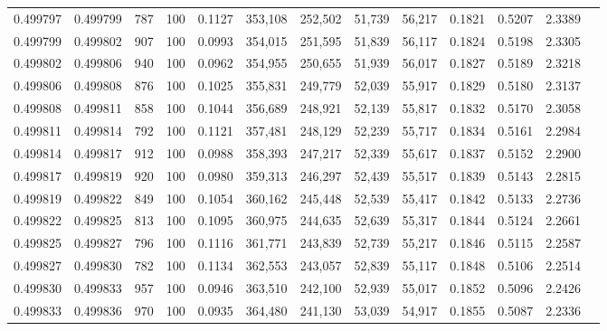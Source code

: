 \begin{tabular}{rrrrrrrrrrrrr}
0.499797 & 0.499799 &   787 & 100 &                                     0.1127 & 353,108 & 252,502 &  51,739 &  56,217 & 0.1821 & 0.5207 & 2.3389 \\
0.499799 & 0.499802 &   907 & 100 &                                     0.0993 & 354,015 & 251,595 &  51,839 &  56,117 & 0.1824 & 0.5198 & 2.3305 \\
0.499802 & 0.499806 &   940 & 100 &                                     0.0962 & 354,955 & 250,655 &  51,939 &  56,017 & 0.1827 & 0.5189 & 2.3218 \\
0.499806 & 0.499808 &   876 & 100 &                                     0.1025 & 355,831 & 249,779 &  52,039 &  55,917 & 0.1829 & 0.5180 & 2.3137 \\
0.499808 & 0.499811 &   858 & 100 &                                     0.1044 & 356,689 & 248,921 &  52,139 &  55,817 & 0.1832 & 0.5170 & 2.3058 \\
0.499811 & 0.499814 &   792 & 100 &                                     0.1121 & 357,481 & 248,129 &  52,239 &  55,717 & 0.1834 & 0.5161 & 2.2984 \\
0.499814 & 0.499817 &   912 & 100 &                                     0.0988 & 358,393 & 247,217 &  52,339 &  55,617 & 0.1837 & 0.5152 & 2.2900 \\
0.499817 & 0.499819 &   920 & 100 &                                     0.0980 & 359,313 & 246,297 &  52,439 &  55,517 & 0.1839 & 0.5143 & 2.2815 \\
0.499819 & 0.499822 &   849 & 100 &                                     0.1054 & 360,162 & 245,448 &  52,539 &  55,417 & 0.1842 & 0.5133 & 2.2736 \\
0.499822 & 0.499825 &   813 & 100 &                                     0.1095 & 360,975 & 244,635 &  52,639 &  55,317 & 0.1844 & 0.5124 & 2.2661 \\
0.499825 & 0.499827 &   796 & 100 &                                     0.1116 & 361,771 & 243,839 &  52,739 &  55,217 & 0.1846 & 0.5115 & 2.2587 \\
0.499827 & 0.499830 &   782 & 100 &                                     0.1134 & 362,553 & 243,057 &  52,839 &  55,117 & 0.1848 & 0.5106 & 2.2514 \\
0.499830 & 0.499833 &   957 & 100 &                                     0.0946 & 363,510 & 242,100 &  52,939 &  55,017 & 0.1852 & 0.5096 & 2.2426 \\
0.499833 & 0.499836 &   970 & 100 &                                     0.0935 & 364,480 & 241,130 &  53,039 &  54,917 & 0.1855 & 0.5087 & 2.2336 \\

\end{tabular}
